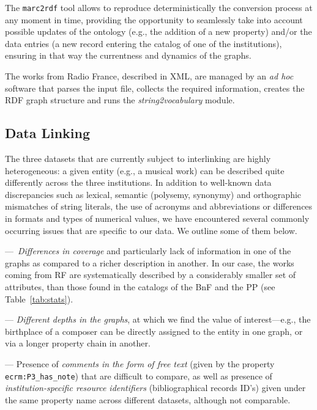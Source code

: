 The {\tt marc2rdf} tool allows to reproduce deterministically the conversion process at any moment in time, providing the opportunity to seamlessly take into account possible updates of the ontology (e.g., the addition of a new property) and/or the data entries (a new record entering the catalog of one of the institutions), ensuring in that way the currentness and dynamics of the graphs. 

The works from Radio France, described in XML, are managed by an \textit{ad hoc} software that parses the input file, collects the required information, creates the RDF graph structure  and runs the \textit{string2vocabulary} module.%

\subsection{Data Linking}
The three datasets that are currently subject to interlinking are highly heterogeneous: a given entity (e.g., a musical work) can be described quite differently across the three institutions. In addition to well-known data discrepancies such as lexical, semantic (polysemy, synonymy) and orthographic mismatches of string literals, the use of acronyms and abbreviations or differences in formats and types of numerical values, we have encountered several commonly occurring issues that are specific to our data. We outline some of them below.

---~{\it Differences in coverage} and particularly lack of information in one of the graphs as compared to a richer description in another. In our case, the  works coming from RF are systematically described by a considerably smaller set of attributes, than those found in the catalogs of the BnF and the PP (see Table~\ref{tab:stats}). 

--- {\it Different depths in the graphs}, at which we find the value of interest---e.g., the birthplace of a composer can be directly assigned to the entity in one graph, or via a longer property chain in another. 

--- Presence of {\it comments in the form of free text} (given by the property {\tt ecrm:P3\_has\_note}) that are difficult to compare, as well as presence of {\it institution-specific resource identifiers} (bibliographical records ID's) given under the same property name across different datasets, although not comparable.%

